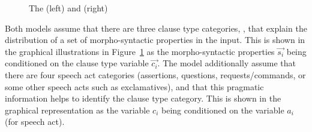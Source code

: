 \begin{figure}[H]
\begin{minipage}[b]{0.45\linewidth}	
\begin{center}
\end{center}
\end{minipage}
\hspace{0.5cm}
\begin{minipage}[b]{0.45\linewidth}	
\begin{center}
\end{center}
\end{minipage}
\caption{The  \distlearner{} (left) and \praglearner{} (right)}\label{fig:engcl:model}
\end{figure}




Both models assume that there are three clause type categories, \diis{}, that explain the distribution of a set of morpho-syntactic properties in the input. This is shown in the graphical illustrations in Figure~\ref{fig:engcl:model} as the morpho-syntactic properties $\vec{s_{i}}$ being conditioned on the clause type variable $\vec{c_{i}}$. The \plearnerabbr{} model additionally assume that there are four speech act categories (assertions, questions, requests/commands, or some other speech acts such as exclamatives), and that this pragmatic information helps to identify the clause type category. This is shown in the graphical representation as the variable $c_{i}$ being conditioned on the variable $a_{i}$ (for speech act). 

